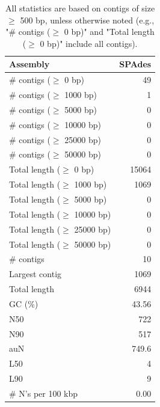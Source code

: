 \documentclass[12pt,a4paper]{article}
\begin{document}
\begin{table}[ht]
\begin{center}
\caption{All statistics are based on contigs of size $\geq$ 500 bp, unless otherwise noted (e.g., "\# contigs ($\geq$ 0 bp)" and "Total length ($\geq$ 0 bp)" include all contigs).}
\begin{tabular}{|l*{1}{|r}|}
\hline
Assembly & SPAdes \\ \hline
\# contigs ($\geq$ 0 bp) & 49 \\ \hline
\# contigs ($\geq$ 1000 bp) & 1 \\ \hline
\# contigs ($\geq$ 5000 bp) & 0 \\ \hline
\# contigs ($\geq$ 10000 bp) & 0 \\ \hline
\# contigs ($\geq$ 25000 bp) & 0 \\ \hline
\# contigs ($\geq$ 50000 bp) & 0 \\ \hline
Total length ($\geq$ 0 bp) & 15064 \\ \hline
Total length ($\geq$ 1000 bp) & 1069 \\ \hline
Total length ($\geq$ 5000 bp) & 0 \\ \hline
Total length ($\geq$ 10000 bp) & 0 \\ \hline
Total length ($\geq$ 25000 bp) & 0 \\ \hline
Total length ($\geq$ 50000 bp) & 0 \\ \hline
\# contigs & 10 \\ \hline
Largest contig & 1069 \\ \hline
Total length & 6944 \\ \hline
GC (\%) & 43.56 \\ \hline
N50 & 722 \\ \hline
N90 & 517 \\ \hline
auN & 749.6 \\ \hline
L50 & 4 \\ \hline
L90 & 9 \\ \hline
\# N's per 100 kbp & 0.00 \\ \hline
\end{tabular}
\end{center}
\end{table}
\end{document}
